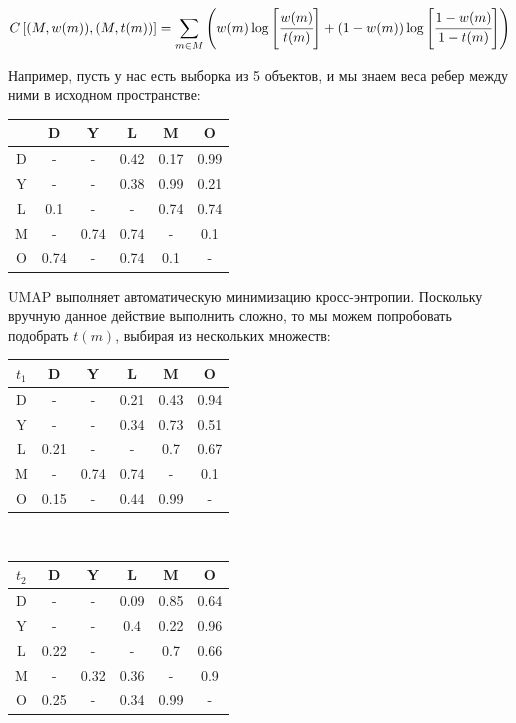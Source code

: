 \[C\left[(M, w(m)), (M, t(m))\right] = \sum_{m \in M} \left(w(m) \log \left[\cfrac{w(m)}{t(m)}\right] + (1 - w(m)) \log \left[\cfrac{1 - w(m)}{1 - t(m)}\right]\right)\]

Например, пусть у нас есть выборка из 5 объектов, и мы знаем веса ребер между ними в исходном пространстве:
\begin{center}
	\begin{tabular}{|c||c|c|c|c|c|}
		\hline
		& D & Y & L & M & O\\
		\hline
		\hline
		D & - & - & 0.42 & 0.17 & 0.99\\
		\hline
		Y & - & - & 0.38 & 0.99 & 0.21\\
		\hline
		L & 0.1 & - & - & 0.74 & 0.74 \\
		\hline
		M & - & 0.74 & 0.74 & - & 0.1 \\
		\hline 
		O & 0.74 & - & 0.74 & 0.1 & -\\
		\hline 
	\end{tabular}
\end{center}

UMAP выполняет автоматическую минимизацию кросс-энтропии. Поскольку вручную данное действие выполнить сложно, то мы можем попробовать подобрать $t(m)$, выбирая из нескольких множеств:

\begin{center}
	\begin{multicols}{2}
		\begin{tabular}{|c||c|c|c|c|c|}
			\hline
			$t_1$ & D & Y & L & M & O \\
			\hline
			\hline
			D & - & - & 0.21 & 0.43 & 0.94 \\
			\hline
			Y & - & - & 0.34 & 0.73 & 0.51 \\
			\hline
			L & 0.21 & - & - & 0.7 & 0.67 \\
			\hline
			M & - & 0.74 & 0.74 & - & 0.1 \\
			\hline 
			O & 0.15 & - & 0.44 & 0.99 & - \\
			\hline 
		\end{tabular}\\
		\begin{tabular}{|c||c|c|c|c|c|}
			\hline
			$t_2$ & D & Y & L & M & O\\
			\hline
			\hline
			D & - & - & 0.09 & 0.85 & 0.64\\
			\hline
			Y & - & - & 0.4 & 0.22 & 0.96\\
			\hline
			L & 0.22 & - & - & 0.7 & 0.66\\
			\hline
			M & - & 0.32 & 0.36 & - & 0.9 \\
			\hline 
			O & 0.25 & - & 0.34 & 0.99 & -\\
			\hline 
		\end{tabular}
	\end{multicols}
\end{center}

